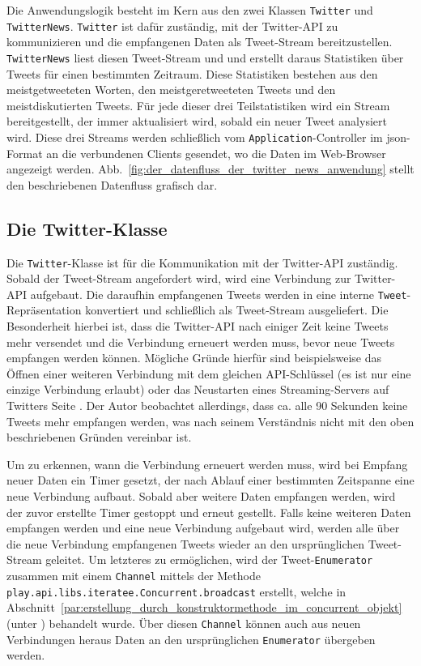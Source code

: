Die Anwendungslogik besteht im Kern aus den zwei Klassen \lstinline|Twitter| und \lstinline|TwitterNews|.
\lstinline|Twitter| ist dafür zuständig, mit der Twitter-API zu kommunizieren und die empfangenen Daten als Tweet-Stream bereitzustellen.
\lstinline|TwitterNews| liest diesen Tweet-Stream und und erstellt daraus Statistiken über Tweets für einen bestimmten Zeitraum.
Diese Statistiken bestehen aus den meistgetweeteten Worten, den meistgeretweeteten Tweets und den meistdiskutierten Tweets.
Für jede dieser drei Teilstatistiken wird ein Stream bereitgestellt, der immer aktualisiert wird, sobald ein neuer Tweet analysiert wird.
Diese drei Streams werden schließlich vom \lstinline|Application|-Controller im \gls{json}-Format an die verbundenen Clients gesendet, wo die Daten im Web-Browser angezeigt werden.
Abb.~\ref{fig:der_datenfluss_der_twitter_news_anwendung} stellt den beschriebenen Datenfluss grafisch dar.


\subsection{Die Twitter-Klasse} %
\label{sub:die_twitter_klasse}

Die \lstinline|Twitter|-Klasse ist für die Kommunikation mit der Twitter-API zuständig.
Sobald der Tweet-Stream angefordert wird, wird eine Verbindung zur Twitter-API aufgebaut.
Die daraufhin empfangenen Tweets werden in eine interne \lstinline|Tweet|-Repräsentation konvertiert und schließlich als Tweet-Stream ausgeliefert.
Die Besonderheit hierbei ist, dass die Twitter-API nach einiger Zeit keine Tweets mehr versendet und die Verbindung erneuert werden muss, bevor neue Tweets empfangen werden können.
Mögliche Gründe hierfür sind beispielsweise das Öffnen einer weiteren Verbindung mit dem gleichen API-Schlüssel (es ist nur eine einzige Verbindung erlaubt) oder das Neustarten eines Streaming-Servers auf Twitters Seite \cite[vgl.][]{twitter_connecting_to_streaming_endpoint}.
Der Autor beobachtet allerdings, dass ca. alle 90 Sekunden keine Tweets mehr empfangen werden, was nach seinem Verständnis nicht mit den oben beschriebenen Gründen vereinbar ist.

Um zu erkennen, wann die Verbindung erneuert werden muss, wird bei Empfang neuer Daten ein Timer gesetzt, der nach Ablauf einer bestimmten Zeitspanne eine neue Verbindung aufbaut.
Sobald aber weitere Daten empfangen werden, wird der zuvor erstellte Timer gestoppt und erneut gestellt.
Falls keine weiteren Daten empfangen werden und eine neue Verbindung aufgebaut wird, werden alle über die neue Verbindung empfangenen Tweets wieder an den ursprünglichen Tweet-Stream geleitet.
Um letzteres zu ermöglichen, wird der Tweet-\lstinline|Enumerator| zusammen mit einem \lstinline|Channel| mittels der Methode \lstinline|play.api.libs.iteratee.Concurrent.broadcast| erstellt, welche in Abschnitt~\ref{par:erstellung_durch_konstruktormethode_im_concurrent_objekt} (unter ) behandelt wurde.
Über diesen \lstinline|Channel| können auch aus neuen Verbindungen heraus Daten an den ursprünglichen \lstinline|Enumerator| übergeben werden.

